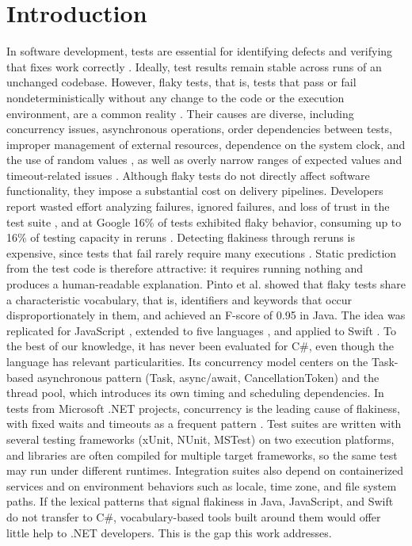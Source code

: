 \section{Introduction} 
In software development, tests are essential for identifying defects and verifying that fixes work correctly \cite{kapfhammer2004software}. Ideally, test results remain stable across runs of an unchanged codebase. However, flaky tests, that is, tests that pass or fail nondeterministically without any change to the code or the execution environment, are a common reality \cite{pinto2020vocabulary}. Their causes are diverse, including concurrency issues, asynchronous operations, order dependencies between tests, improper management of external resources, dependence on the system clock, and the use of random values \cite{luo2014empirical}, as well as overly narrow ranges of expected values and timeout-related issues \cite{eck2019understanding}.
Although flaky tests do not directly affect software functionality, they impose a substantial cost on delivery pipelines. Developers report wasted effort analyzing failures, ignored failures, and loss of trust in the test suite \cite{eck2019understanding, gruber2022survey}, and at Google 16\% of tests exhibited flaky behavior, consuming up to 16\% of testing capacity in reruns \cite{micco2017state}. Detecting flakiness through reruns is expensive, since tests that fail rarely require many executions \cite{lam2020study}. Static prediction from the test code is therefore attractive: it requires running nothing and produces a human-readable explanation.
Pinto et al. \cite{pinto2020vocabulary} showed that flaky tests share a characteristic vocabulary, that is, identifiers and keywords that occur disproportionately in them, and achieved an F-score of 0.95 in Java. The idea was replicated for JavaScript \cite{soratto2023vocabulary}, extended to five languages \cite{ahmad2025understanding}, and applied to Swift \cite{medeiros2026vocabulary}. To the best of our knowledge, it has never been evaluated for C\#, even though the language has relevant particularities. Its concurrency model centers on the Task-based asynchronous pattern (Task, async/await, CancellationToken) and the thread pool, which introduces its own timing and scheduling dependencies. In tests from Microsoft .NET projects, concurrency is the leading cause of flakiness, with fixed waits and timeouts as a frequent pattern \cite{leesatapornwongsa2022flakerepro}. Test suites are written with several testing frameworks (xUnit, NUnit, MSTest) on two execution platforms, and libraries are often compiled for multiple target frameworks, so the same test may run under different runtimes. Integration suites also depend on containerized services and on environment behaviors such as locale, time zone, and file system paths. If the lexical patterns that signal flakiness in Java, JavaScript, and Swift do not transfer to C\#, vocabulary-based tools built around them would offer little help to .NET developers. This is the gap this work addresses.
